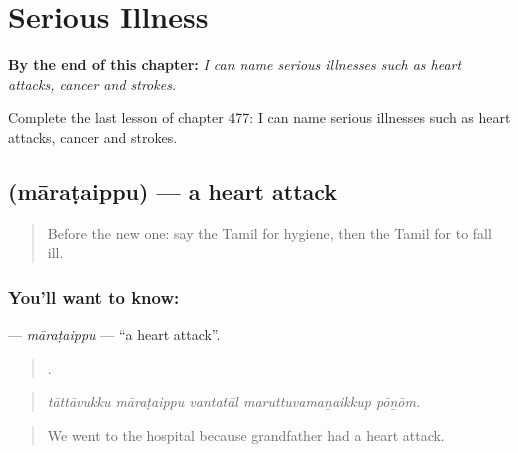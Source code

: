 
\chapter{Serious Illness}
\label{ch:ta-serious-illness}

\begin{chapteropening}
\textbf{By the end of this chapter:} \emph{I can name serious illnesses such as heart attacks, cancer and strokes.}

Complete the last lesson of chapter 477: I can name serious illnesses such as heart attacks, cancer and strokes.
\end{chapteropening}

\section[\texorpdfstring{\ta{மாரடைப்பு} (māraṭaippu)}{மாரடைப்பு (māraṭaippu)}]{ (māraṭaippu) — a heart attack}

\label{lesson:TA-C477-marataippu}



\begin{quote}
Before the new one: say the Tamil for hygiene, then the Tamil for to fall ill.
\end{quote}

\subsection*{You'll want to know: }
\textbf{} — \emph{māraṭaippu} — \textquotedblleft{}a heart attack\textquotedblright{}.

\begin{quote}
    .
\end{quote}

\begin{quote}
\emph{tāttāvukku māraṭaippu vantatāl maruttuvamaṉaikkup pōṉōm.}
\end{quote}

\begin{quote}
We went to the hospital because grandfather had a heart attack.
\end{quote}

